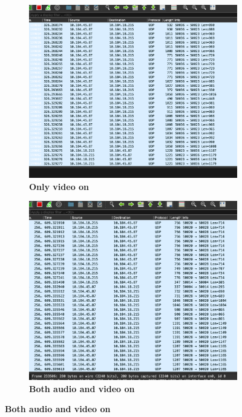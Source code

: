 \documentclass{article}
\begin{document}
\begin{figure}[H]
    \centering
    \begin{subfigure}[b]{0.48\textwidth}
        \centering
        \includegraphics[width=\textwidth]{only_video.png}
        \caption*{\textbf{Only video on}}
    \end{subfigure}
    \hfill
    \begin{subfigure}[b]{0.465\textwidth}
        \centering
        \includegraphics[width=\textwidth]{audio_and_video.png}
        \caption*{\textbf{Both audio and video on}}
    \end{subfigure}

\end{figure}
\end{document}
